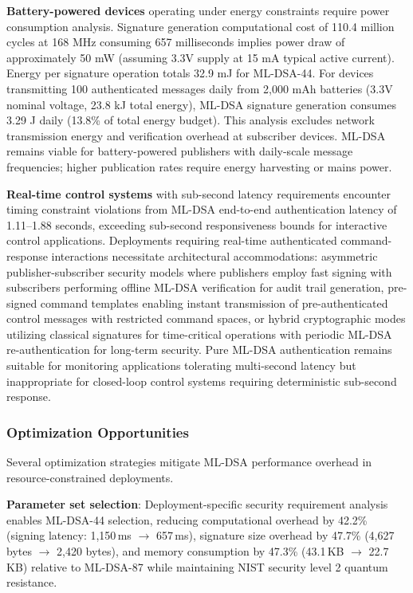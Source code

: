 \documentclass[final, twoside]{IEEEtran} %
\begin{document}
\textbf{Battery-powered devices} operating under energy constraints require power consumption analysis. Signature generation computational cost of 110.4 million cycles at 168 MHz consuming 657 milliseconds implies power draw of approximately 50 mW (assuming 3.3V supply at 15 mA typical active current). Energy per signature operation totals 32.9 mJ for ML-DSA-44. For devices transmitting 100 authenticated messages daily from 2,000 mAh batteries (3.3V nominal voltage, 23.8 kJ total energy), ML-DSA signature generation consumes 3.29 J daily (13.8\% of total energy budget). This analysis excludes network transmission energy and verification overhead at subscriber devices. ML-DSA remains viable for battery-powered publishers with daily-scale message frequencies; higher publication rates require energy harvesting or mains power.

\textbf{Real-time control systems} with sub-second latency requirements encounter timing constraint violations from ML-DSA end-to-end authentication latency of 1.11--1.88 seconds, exceeding sub-second responsiveness bounds for interactive control applications. Deployments requiring real-time authenticated command-response interactions necessitate architectural accommodations: asymmetric publisher-subscriber security models where publishers employ fast signing with subscribers performing offline ML-DSA verification for audit trail generation, pre-signed command templates enabling instant transmission of pre-authenticated control messages with restricted command spaces, or hybrid cryptographic modes utilizing classical signatures for time-critical operations with periodic ML-DSA re-authentication for long-term security. Pure ML-DSA authentication remains suitable for monitoring applications tolerating multi-second latency but inappropriate for closed-loop control systems requiring deterministic sub-second response.

\subsubsection{Optimization Opportunities}

Several optimization strategies mitigate ML-DSA performance overhead in resource-constrained deployments.

\textbf{Parameter set selection}: Deployment-specific security requirement analysis enables ML-DSA-44 selection, reducing computational overhead by 42.2\% (signing latency: 1,150\,ms $\rightarrow$ 657\,ms), signature size overhead by 47.7\% (4,627 bytes $\rightarrow$ 2,420 bytes), and memory consumption by 47.3\% (43.1\,KB $\rightarrow$ 22.7\,KB) relative to ML-DSA-87 while maintaining NIST security level 2 quantum resistance.
\end{document}
